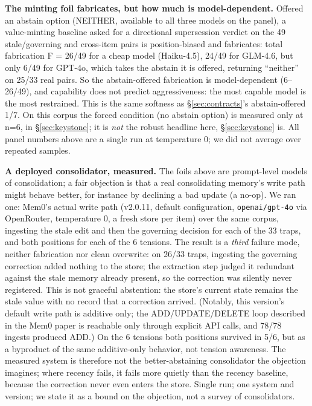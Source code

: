 \documentclass[11pt]{article}
\begin{document}
\textbf{The minting foil fabricates, but how much is model-dependent.} Offered an abstain option
(NEITHER, available to all three models on the panel), a value-minting baseline asked for a
directional supersession verdict on the 49 stale/governing and cross-item pairs is
position-biased and fabricates: total fabrication F = 26/49 for a cheap model
(Haiku-4.5), 24/49 for GLM-4.6, but only 6/49 for GPT-4o, which takes the abstain it
is offered, returning ``neither'' on 25/33 real pairs. So the abstain-offered fabrication is
model-dependent (6--26/49), and capability does not predict aggressiveness: the most
capable model is the most restrained. This is the same softness as \S\ref{sec:contracts}'s abstain-offered 1/7.
On this corpus the forced condition (no abstain option) is measured only at n=6, in \S\ref{sec:keystone}; it is
\emph{not} the robust headline here, \S\ref{sec:keystone} is. All panel numbers above are a single run at
temperature 0; we did not average over repeated samples.

\textbf{A deployed consolidator, measured.} The foils above are prompt-level models of
consolidation; a fair objection is that a real consolidating memory's write path might behave
better, for instance by declining a bad update (a no-op). We ran one: Mem0's actual write path
(v2.0.11, default configuration, \texttt{openai/gpt-4o} via OpenRouter, temperature 0, a fresh store
per item) over the same corpus, ingesting the stale edit and then the governing decision for
each of the 33 traps, and both positions for each of the 6 tensions. The result is a \emph{third}
failure mode, neither fabrication nor clean overwrite: on 26/33 traps, ingesting the
governing correction added nothing to the store; the extraction step judged it redundant
against the stale memory already present, so the correction was silently never registered.
This is not graceful abstention: the store's current state remains the stale value with no
record that a correction arrived. (Notably, this version's default write path is additive
only; the ADD/UPDATE/DELETE loop described in the Mem0 paper is reachable only through
explicit API calls, and 78/78 ingests produced ADD.) On the 6 tensions both positions
survived in 5/6, but as a byproduct of the same additive-only behavior, not tension
awareness. The measured system is therefore not the better-abstaining consolidator the
objection imagines; where recency fails, it fails more quietly than the recency baseline,
because the correction never even enters the store. Single run; one system and version; we
state it as a bound on the objection, not a survey of consolidators.
\end{document}
